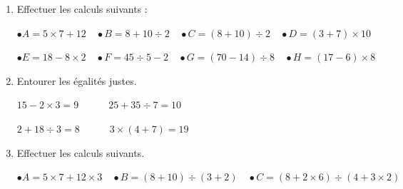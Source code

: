 \documentclass[a4paper]{book}
\begin{document}
    \begin{exercice}
        \begin{enumerate}
            \item Effectuer les calculs suivants :

            \begin{center}
                $\bullet A=5\times7+12 
                \quad \bullet B=8+10\div2 
                \quad \bullet C=(8+10)\div2 
                \quad \bullet D=(3+7)\times 10$
    
                $\bullet E=18-8\times2 
                \quad \bullet F=45\div 5 - 2
                \quad \bullet G=(70-14)\div8
                \quad \bullet H=(17-6)\times 8$
            \end{center}
            
            \item Entourer les égalités justes.

            \begin{center}
                $15-2\times3=9 
                \quad \quad \quad 25+35\div7=10 $
            \end{center}

            \begin{center}
                $2+18\div3=8 
                \quad \quad \quad 3\times(4+7)=19 $
            \end{center}
            
            \item Effectuer les calculs suivants.

            \begin{center}
                $\bullet A=5\times7+12\times3
                \quad \bullet B=(8+10)\div(3+2) 
                \quad \bullet C=(8+2\times6)\div(4+3\times2)$
            \end{center}
            
        \end{enumerate}
    \end{exercice}


\newpage


\setcounter{exo}{1}
\end{document}
